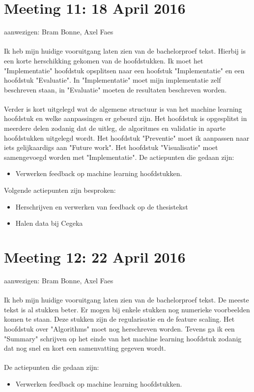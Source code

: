 \section{Meeting 11: 18 April 2016}
aanwezigen: Bram Bonne, Axel Faes \\
\\
Ik heb mijn huidige vooruitgang laten zien van de bachelorproef tekst. Hierbij is een korte herschikking gekomen van de hoofdstukken. Ik moet het "Implementatie" hoofdstuk opsplitsen naar een hoofstuk "Implementatie" en een hoofdstuk "Evaluatie". In "Implementatie" moet mijn implementatie zelf beschreven staan, in "Evaluatie" moeten de resultaten beschreven worden. \\\\
Verder is kort uitgelegd wat de algemene structuur is van het machine learning hoofdstuk en welke aanpassingen er gebeurd zijn. Het hoofdstuk is opgesplitst in meerdere delen zodanig dat de uitleg, de algoritmes en validatie in aparte hoofdstukken uitgelegd wordt. Het hoofdstuk "Preventie" moet ik aanpassen naar iets gelijkaardigs aan "Future work". Het hoofdstuk "Visualisatie" moet samengevoegd worden met "Implementatie".
De actiepunten die gedaan zijn:
\begin{itemize}  
        \item  Verwerken feedback op machine learning hoofdstukken.
\end{itemize}

Volgende actiepunten zijn besproken:
\begin{itemize}  		
		\item Herschrijven en verwerken van feedback op de thesistekst
        \item Halen data bij Cegeka
\end{itemize}
\section{Meeting 12: 22 April 2016}
aanwezigen: Bram Bonne, Axel Faes \\
\\
Ik heb mijn huidige vooruitgang laten zien van de bachelorproef tekst. De meeste tekst is al stukken beter. Er mogen bij enkele stukken nog numerieke voorbeelden komen te staan. Deze stukken zijn de regularisatie en de feature scaling. Het hoofdstuk over "Algorithms" moet nog herschreven worden. Tevens ga ik een "Summary" schrijven op het einde van het machine learning hoofdstuk zodanig dat nog snel en kort een samenvatting gegeven wordt.\\
\\
De actiepunten die gedaan zijn:
\begin{itemize}  
        \item  Verwerken feedback op machine learning hoofdstukken.
\end{itemize}

